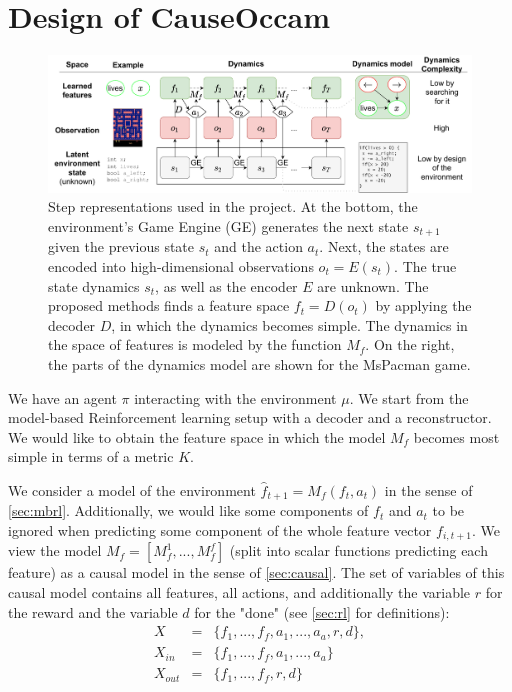\documentclass[a4paper,11pt,oneside]{report}
\newcommand{\sysname}{CauseOccam\xspace}
\begin{document}
\chapter{Design of \sysname}
\label{ch:design}
\begin{figure}[h]
    \centering
    \includegraphics[width=0.99\linewidth]{diagrams/step_spaces}
    \caption{Step representations used in the project. At the bottom, the environment's Game Engine (GE) generates the next state $s_{t+1}$ given the previous state $s_t$ and the action $a_t$. Next, the states are encoded into high-dimensional observations $o_t=E(s_t)$. The true state dynamics $s_t$, as well as the encoder $E$ are unknown. The proposed methods finds a feature space $f_t=D(o_t)$ by applying the decoder $D$, in which the dynamics becomes simple. The dynamics in the space of features is modeled by the function $M_f$. On the right, the parts of the dynamics model are shown for the MsPacman \cite{brockman2016openai} game.}
    \label{fig:step_spaces}
\end{figure}


We have an agent $\pi$ interacting with the environment $\mu$. We start from the model-based Reinforcement learning setup with a decoder and a reconstructor. We would like to obtain the feature space in which the model $M_f$ becomes most simple in terms of a metric $K$. %

We consider a model of the environment $\hat{f}_{t+1}=M_f(f_t,a_t)$ in the sense of \autoref{sec:mbrl}. Additionally, we would like some components of $f_t$ and $a_t$ to be ignored when predicting some component of the whole feature vector $f_{i,t+1}$. We view the model $M_f=[M_f^1,...,M_f^f]$ (split into scalar functions predicting each feature) as a causal model in the sense of \autoref{sec:causal}. The set of variables of this causal model contains all features, all actions, and additionally the variable $r$ for the reward and the variable $d$ for the "done" (see \autoref{sec:rl} for definitions):
$$
\begin{array}{lcl}
X&=&\{f_1,...,f_f,a_1,...,a_a,r,d\},\\
X_{in}&=&\{f_1,...,f_f,a_1,...,a_a\}\\
X_{out}&=&\{f_1,...,f_f,r,d\}
\end{array}
$$
\end{document}
